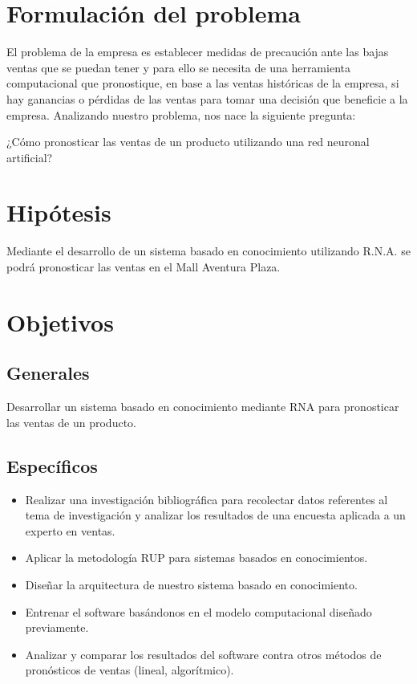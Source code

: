 \section{Formulación del problema}
El problema de la empresa es establecer medidas de precaución ante las bajas ventas que se puedan tener y para ello se necesita de una herramienta computacional que pronostique, en base a las ventas históricas de la empresa, si hay ganancias o pérdidas de las ventas para tomar una decisión que beneficie a la empresa. Analizando nuestro problema, nos nace la siguiente pregunta:
 
 \begin{center} 
     ¿Cómo pronosticar las ventas de un producto utilizando una red neuronal artificial?
 \end{center}

\section{Hipótesis}
Mediante el desarrollo de un sistema basado en conocimiento utilizando R.N.A. se podrá pronosticar las ventas en el Mall Aventura Plaza.




\section{Objetivos}
\subsection{Generales}
Desarrollar un sistema basado en conocimiento mediante RNA para pronosticar las ventas de un producto.
\subsection{Específicos}
\begin{itemize}
\item Realizar una investigación bibliográfica para recolectar datos referentes al tema de investigación y analizar los resultados de una encuesta aplicada a un experto en ventas.
\item Aplicar la metodología RUP para sistemas basados en conocimientos.
\item Diseñar la arquitectura de nuestro sistema basado en conocimiento.
\item Entrenar el software basándonos en el modelo computacional diseñado previamente.
\item Analizar y comparar los resultados del software contra otros métodos de pronósticos de ventas (lineal, algorítmico).
\end{itemize}

